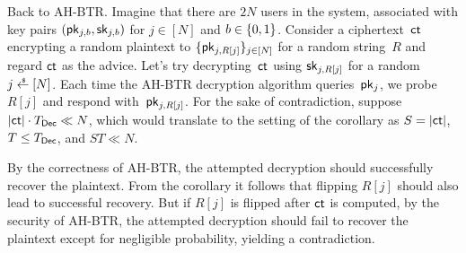 Back to AH-BTR. Imagine that there are $2N$ users in the system, associated with key pairs $(\pk_{j,b},\sk_{j,b})$ for ${j\in[N]}$ and ${b\in{\{0,1\}}}$.
Consider a ciphertext~$\ct$ encrypting a random plaintext to $\{\pk_{j,R[j]}\}_{j\in[N]}$ for a random string~$R$ and
regard $\ct$ as the advice.
Let's try decrypting~$\ct$ using $\sk_{j,R[j]}$ for a random ${j\draws[N]}$.
Each time the AH-BTR decryption algorithm queries~$\pk_j$,
we probe $R[j]$ and respond with~$\pk_{j,R[j]}$.
For the sake of contradiction, suppose ${|\ct|\cdot\TDec\ll N}$,
which would translate to the setting of the corollary as ${S=|\ct|}$, ${T\leq\TDec}$, and ${ST\ll N}$.

By the correctness of AH-BTR,
the attempted decryption should successfully recover the plaintext.
From the corollary it follows that flipping $R[j]$ should also lead to successful recovery.
But if $R[j]$ is flipped after $\ct$ is computed,
by the security of AH-BTR,
the attempted decryption should fail to recover the plaintext except for negligible probability, yielding a contradiction.
